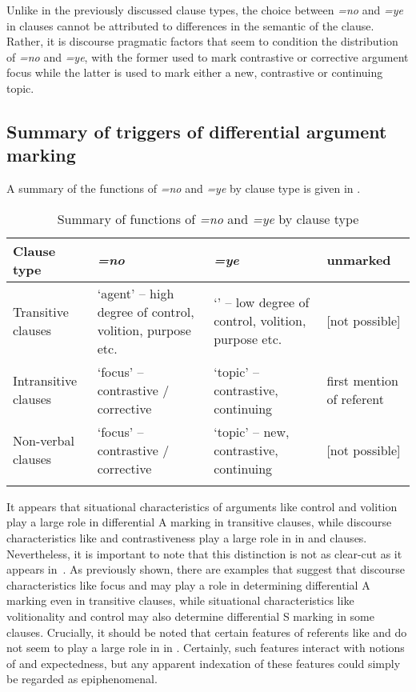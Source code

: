 \documentclass[output=paper]{LSP/langsci}
\begin{document}
Unlike in the previously discussed clause types, the choice between \textit{=no} and \textit{=ye} in  clauses cannot be attributed to differences in the semantic  of the clause. 
Rather, it is discourse pragmatic factors that seem to condition the distribution of \textit{=no} and \textit{=ye}, with the former used to mark contrastive or corrective argument focus while the latter is used to mark either a new, contrastive or continuing topic.


\subsection{Summary of triggers of differential argument marking}\label{13-te-sec:3.4}

A summary of the functions of \textit{=no} and \textit{=ye} by clause type is given in .

\begin{table}
\caption{Summary of functions of \textit{=no} and \textit{=ye} by clause type}\label{13-te-tab:1}
\begin{tabularx}{\textwidth}{LLLL}
\lsptoprule

Clause type & \textbf{\textit{=no}} & \textbf{\textit{=ye}} & \textbf{unmarked}\\
\midrule
Transitive clauses & ‘agent’ – high degree of control, volition, purpose etc. & ‘’ – low degree of control, volition, purpose etc. & [not possible]\\
Intransitive clauses & ‘focus’ – contrastive / corrective & ‘topic’ – contrastive, continuing & first mention of referent\\
Non-verbal clauses & ‘focus’ – contrastive / corrective & ‘topic’ – new, contrastive, continuing & [not possible]\\
\lspbottomrule
\end{tabularx}
\end{table}

It appears that situational characteristics of arguments like control and volition play a large role in differential A marking in transitive clauses, while discourse characteristics like  and contrastiveness play a large role in  in  and  clauses. Nevertheless, it is important to note that this distinction is not as clear-cut as it appears in~. As previously shown, there are examples that suggest that discourse characteristics like focus and  may play a role in determining differential A marking even in transitive clauses, while situational characteristics like volitionality and control may also determine differential S marking in some  clauses. 
Crucially, it should be noted that certain features of referents like  and  do not seem to play a large role in  in . 
Certainly, such features interact with notions of  and expectedness, but any apparent indexation of these features could simply be regarded as epiphenomenal.
\end{document}
